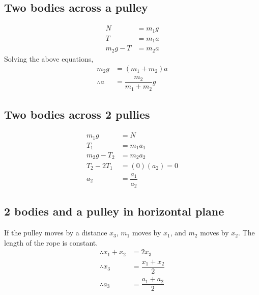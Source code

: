 \documentclass[fleqn]{article}
\begin{document}
\subsection{Two bodies across a pulley}

\begin{align*}
	N &= m_1 g\\
	T &= m_1 a\\
	m_2 g - T &= m_2 a
\end{align*}
Solving the above equations,
\begin{align*}
	m_2 g &= (m_1 + m_2)a\\
	\therefore a &= \dfrac{m_2}{m_1 + m_2} g
\end{align*}

\subsection{Two bodies across 2 pullies}

\begin{align*}
	m_1 g &= N\\
	T_1 &= m_1 a_1\\
	m_2 g - T_2 &= m_2 a_2\\
	T_2 - 2T_1 &= (0)(a_2) = 0\\
	a_2 &= \dfrac{a_1}{a_2}
\end{align*}

\subsection{2 bodies and a pulley in horizontal plane}


If the pulley moves by a distance $x_3$, $m_1$ moves by $x_1$, and $m_2$ moves by $x_2$. The length of the rope is constant.
\begin{align*}
	\therefore x_1 + x_2 &= 2 x_3\\
	\therefore x_3 &= \dfrac{x_1 + x_2}{2}\\
	\therefore a_3 &= \dfrac{a_1 + a_2}{2}\\
\end{align*}
\end{document}
